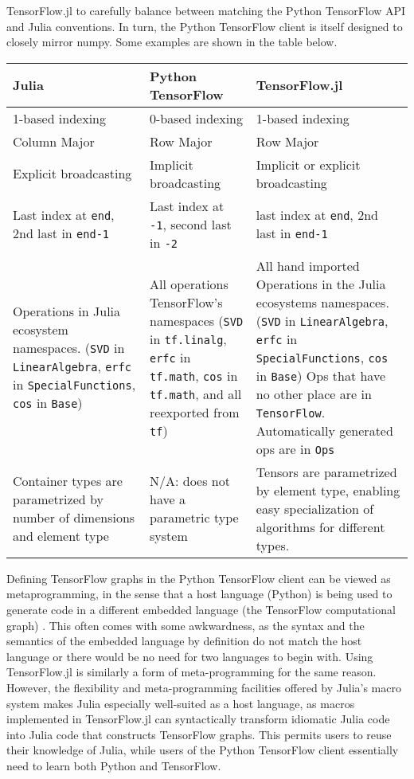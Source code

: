 \documentclass{book}
\begin{document}
\newpage

TensorFlow.jl to carefully balance between matching the Python
TensorFlow API and Julia conventions. In turn, the Python TensorFlow
client is itself designed to closely mirror numpy. Some examples are
shown in the table below.

{	\renewcommand{\arraystretch}{1.5}
\begin{tabularx}{\textwidth}{XXX}
	\toprule
	\textbf{Julia} & \textbf{Python TensorFlow} & \textbf{TensorFlow.jl}\\
	\midrule
	1-based indexing & 0-based indexing & 1-based indexing \\
	Column Major & Row Major & Row Major \\
	Explicit broadcasting & Implicit broadcasting & Implicit or explicit broadcasting \\
	Last index at \texttt{end}, 2nd last in \texttt{end-1} & Last index at \texttt{-1}, second last in \texttt{-2} & last index at \texttt{end}, 2nd last in \texttt{end-1} \\
	Operations in Julia ecosystem namespaces. (\texttt{SVD} in \texttt{LinearAlgebra}, \texttt{erfc} in \texttt{SpecialFunctions}, \texttt{cos} in \texttt{Base}) & All operations TensorFlow's namespaces (\texttt{SVD} in \texttt{tf.linalg}, \texttt{erfc} in \texttt{tf.math}, \texttt{cos} in \texttt{tf.math}, and all reexported from \texttt{tf}) & All hand imported Operations in the Julia ecosystems namespaces. (\texttt{SVD} in \texttt{LinearAlgebra}, \texttt{erfc} in \texttt{SpecialFunctions}, \texttt{cos} in \texttt{Base}) Ops that have no other place are in \texttt{TensorFlow}. Automatically generated ops are in \texttt{Ops} \\

	Container types are parametrized by number of dimensions and element type & N/A: does not have a parametric type system & Tensors are parametrized by element type, enabling easy specialization of algorithms for different types. \\
	\bottomrule
\end{tabularx}
}

Defining TensorFlow graphs in the Python TensorFlow client can be viewed
as metaprogramming, in the sense that a host language (Python) is being
used to generate code in a different embedded language (the TensorFlow
computational graph) \citep{MLandPL}. This often comes with some
awkwardness, as the syntax and the semantics of the embedded language by
definition do not match the host language or there would be no need for
two languages to begin with. Using TensorFlow.jl is similarly a form of
meta-programming for the same reason. However, the flexibility and
meta-programming facilities offered by Julia's macro system makes Julia
especially well-suited as a host language, as macros implemented in
TensorFlow.jl can syntactically transform idiomatic Julia code into
Julia code that constructs TensorFlow graphs. This permits users to
reuse their knowledge of Julia, while users of the Python TensorFlow
client essentially need to learn both Python and TensorFlow.
\end{document}
